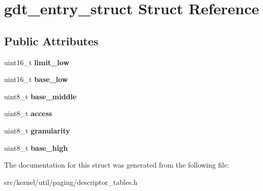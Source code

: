 \hypertarget{structgdt__entry__struct}{}\section{gdt\+\_\+entry\+\_\+struct Struct Reference}
\label{structgdt__entry__struct}
\subsection*{Public Attributes}
\begin{DoxyCompactItemize}
\item 
\mbox{\label{structgdt__entry__struct_a6bbf5ad7af7b8e8e7f7c26ec74d8c1b2}} 
uint16\+\_\+t {\bfseries limit\+\_\+low}
\item 
\mbox{\label{structgdt__entry__struct_adba88eafea5f07167d181e4090cbcf49}} 
uint16\+\_\+t {\bfseries base\+\_\+low}
\item 
\mbox{\label{structgdt__entry__struct_a986d46963d3ccdbec85b3749c1e09abf}} 
uint8\+\_\+t {\bfseries base\+\_\+middle}
\item 
\mbox{\label{structgdt__entry__struct_ac07173385496c5b952e58ddc20f1cc99}} 
uint8\+\_\+t {\bfseries access}
\item 
\mbox{\label{structgdt__entry__struct_a7fb7b3704e10434dbe64564416cf1a25}} 
uint8\+\_\+t {\bfseries granularity}
\item 
\mbox{\label{structgdt__entry__struct_aa08eedea9c0f707b9fa052b7567879c7}} 
uint8\+\_\+t {\bfseries base\+\_\+high}
\end{DoxyCompactItemize}


The documentation for this struct was generated from the following file\+:\begin{DoxyCompactItemize}
\item 
src/kernel/util/paging/descriptor\+\_\+tables.\+h\end{DoxyCompactItemize}
